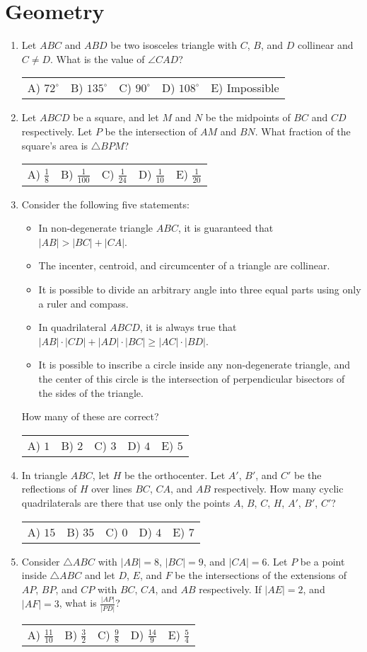 \documentclass{article}
\newcommand{\answers}[5]{
    \newline
    {
        \centering
        \begin{tabular}{p{0.15\textwidth} p{0.15\textwidth} p{0.15\textwidth} p{0.15\textwidth} p{0.15\textwidth}}
            A) #1 & B) #2 & C) #3 & D) #4 & E) #5
        \end{tabular}
    }
}
\begin{document}
\section{Geometry}
\begin{enumerate}[1.]

\item %
Let $ABC$ and $ABD$ be two isosceles triangle with $C$, $B$, and $D$ collinear and $C \ne D$.
What is the value of $\angle CAD$?
\answers{$72^\circ$}{$135^\circ$}{$90^\circ$}{$108^\circ$}{Impossible}

\item %
Let $ABCD$ be a square, and let $M$ and $N$ be the midpoints of $BC$ and $CD$ respectively.
Let $P$ be the intersection of $AM$ and $BN$.
What fraction of the square's area is $\triangle BPM$?
\answers{ $\frac{1}{8}$ }{ $\frac{1}{100}$ }{ $\frac{1}{24}$ }{ $\frac{1}{10}$ }{ $\frac{1}{20}$ }


\item %
Consider the following five statements:
\begin{itemize}
    \item In non-degenerate triangle $ABC$, it is guaranteed that $|AB| > |BC| + |CA|$.
    \item The incenter, centroid, and circumcenter of a triangle are collinear.
    \item It is possible to divide an arbitrary angle into three equal parts using only a ruler and compass.
    \item In quadrilateral $ABCD$, it is always true that $|AB| \cdot |CD| + |AD| \cdot |BC| \ge |AC| \cdot |BD|$.
    \item It is possible to inscribe a circle inside any non-degenerate triangle, and the center of this circle is the intersection of perpendicular bisectors of the sides of the triangle.
\end{itemize}
How many of these are correct?
\answers{$1$}{$2$}{$3$}{$4$}{$5$}

\item %
In triangle $ABC$, let $H$ be the orthocenter.
Let $A'$, $B'$, and $C'$ be the reflections of $H$ over lines $BC$, $CA$, and $AB$ respectively.
How many cyclic quadrilaterals are there that use only the points $A$, $B$, $C$, $H$, $A'$, $B'$, $C'$?
\answers{$15$}{$35$}{$0$}{$4$}{$7$}


\item %
Consider $\triangle ABC$ with $|AB| = 8$, $|BC| = 9$, and $|CA| = 6$.
Let $P$ be a point inside $\triangle ABC$ and let $D$, $E$, and $F$ be the intersections of the extensions of $AP$, $BP$, and $CP$ with $BC$, $CA$, and $AB$ respectively.
If $|AE| = 2$, and $|AF| = 3$, what is $\frac{|AP|}{|PD|}$?
\answers{ $\frac{11}{10}$ }{ $\frac{3}{2}$ }{ $\frac{9}{8}$ }{ $\frac{14}{9}$ }{ $\frac{5}{4}$ }

\end{enumerate}
\end{document}
